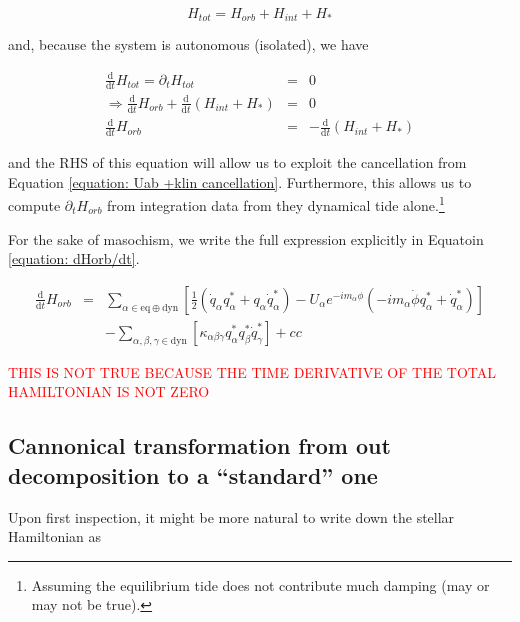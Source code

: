 \begin{equation}
H_{tot} = H_{orb} + H_{int} + H_{\ast}
\end{equation}

and, because the system is autonomous (isolated), we have

\begin{eqnarray}
\frac{\mathrm{d}}{\mathrm{d}t} H_{tot} = \partial_t H_{tot} & = & 0 \\
\Rightarrow \frac{\mathrm{d}}{\mathrm{d}t} H_{orb} + \frac{\mathrm{d}}{\mathrm{d}t} \left( H_{int} + H_\ast \right) & = & 0 \\
\frac{\mathrm{d}}{\mathrm{d}t} H_{orb} & = & -\frac{\mathrm{d}}{\mathrm{d}t} \left( H_{int} + H_\ast \right)
\end{eqnarray}

and the RHS of this equation will allow us to exploit the cancellation from Equation \ref{equation: Uab +klin cancellation}. Furthermore, this allows us to compute $\partial_t H_{orb}$ from integration data from they dynamical tide alone.\footnote{Assuming the equilibrium tide does not contribute much damping (may or may not be true).}

For the sake of masochism, we write the full expression explicitly in Equatoin \ref{equation: dHorb/dt}.

\begin{eqnarray}\label{equation: dHorb/dt}
\frac{\mathrm{d}}{\mathrm{d}t} H_{orb} & = &  \sum_{\alpha\in\mathrm{eq}\oplus\mathrm{dyn}} \left[ \frac{1}{2}\left(\dot{q}_\alpha q_\alpha^\ast + q_\alpha \dot{q}_\alpha^\ast\right)  - U_\alpha e^{-im_\alpha\phi} \left(-im_\alpha\dot{\phi}q_\alpha^\ast + \dot{q}_\alpha^\ast\right) \right] \\
                                       &   & - \sum_{\alpha,\beta,\gamma\in\mathrm{dyn}} \left[\kappa_{\alpha\beta\gamma}q_\alpha^\ast q_\beta^\ast \dot{q}_\gamma^\ast \right] + cc
\end{eqnarray}

\textcolor{red}{THIS IS NOT TRUE BECAUSE THE TIME DERIVATIVE OF THE TOTAL HAMILTONIAN IS NOT ZERO}

\subsection*{Cannonical transformation from out decomposition to a ``standard'' one}

Upon first inspection, it might be more natural to write down the stellar Hamiltonian as

